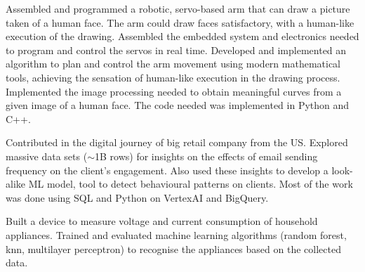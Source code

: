 \documentclass[10pt,a4paper,ragged2e,withhyper]{altacv}
\begin{document}
\begin{paracol}{2}
\bigskip



Assembled and programmed a robotic, servo-based arm that can draw a picture taken of a human face. The arm could draw faces satisfactory, with a human-like execution of the drawing. Assembled the embedded system and electronics needed to program and control the servos in real time. Developed and implemented an algorithm to plan and control the arm movement using modern mathematical tools, achieving the sensation of human-like execution in the drawing process. Implemented the image processing needed to obtain meaningful curves from a given image of a human face. The code needed was implemented in Python and C++.  

\bigskip


Contributed in the digital journey of big retail company from the US. Explored massive data sets ($\sim$1B rows) for insights on the effects of email sending frequency on the client's engagement. Also used these insights to develop a look-alike ML model, tool to detect behavioural patterns on clients. Most of the work was done using SQL and Python on VertexAI and BigQuery.

\bigskip


\newpage


Built a device to measure voltage and current consumption
of household appliances. Trained and evaluated
machine learning algorithms (random forest, knn, multilayer
perceptron) to recognise the appliances based on
the collected data.

\bigskip


\end{paracol}
\end{document}
